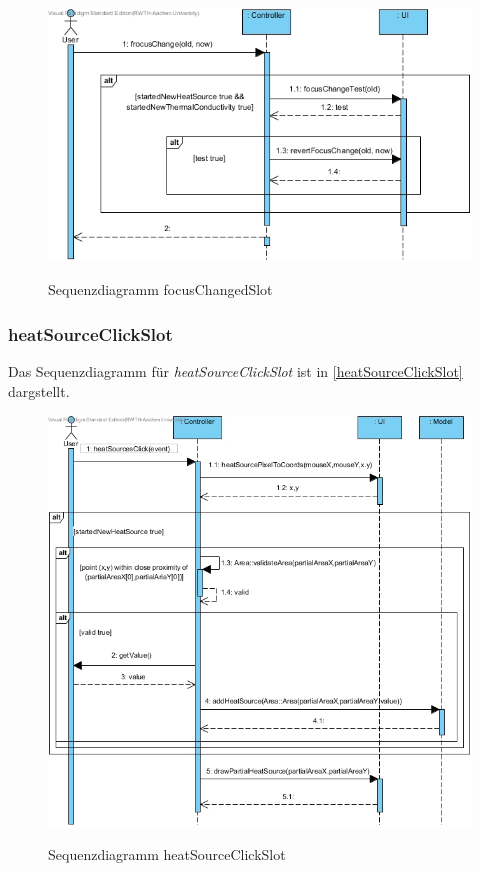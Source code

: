 \begin{figure}[H]
	\centering
	\includegraphics[scale=.6]{Bilder/Controller__focusChangeSlot().jpg}\\
	\caption{Sequenzdiagramm focusChangedSlot}
	\label{Sequenzdiagramm focusChangedSlot}
\end{figure}

\subsubsection*{heatSourceClickSlot}

Das Sequenzdiagramm für \emph{heatSourceClickSlot} ist in \ref{heatSourceClickSlot} dargstellt.

\begin{figure}[H]
	\centering
	\includegraphics[scale=.6]{Bilder/Controller__heatSourcesClickSlot().jpg}\\
	\caption{Sequenzdiagramm heatSourceClickSlot}
	\label{Sequenzdiagramm heatSourceClickSlot}
\end{figure}

